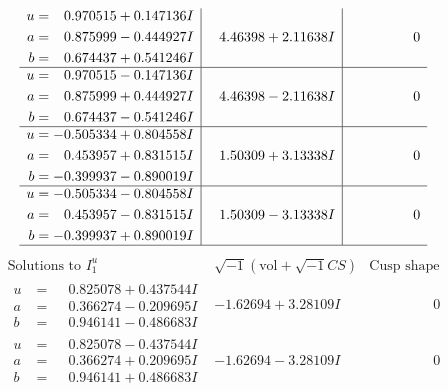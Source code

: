 \documentclass[1p]{elsarticle_modified}
\theoremstyle{definition}
\newcommand{\I}{\sqrt{-1}}
\begin{document}
$$\begin{array}{c|c|c}
\begin{aligned}
u &= \phantom{-}0.970515 + 0.147136 I \\
a &= \phantom{-}0.875999 - 0.444927 I \\
b &= \phantom{-}0.674437 + 0.541246 I\end{aligned}
 & \phantom{-}4.46398 + 2.11638 I & \phantom{-0.000000 } 0 \\ \hline\begin{aligned}
u &= \phantom{-}0.970515 - 0.147136 I \\
a &= \phantom{-}0.875999 + 0.444927 I \\
b &= \phantom{-}0.674437 - 0.541246 I\end{aligned}
 & \phantom{-}4.46398 - 2.11638 I & \phantom{-0.000000 } 0 \\ \hline\begin{aligned}
u &= -0.505334 + 0.804558 I \\
a &= \phantom{-}0.453957 + 0.831515 I \\
b &= -0.399937 - 0.890019 I\end{aligned}
 & \phantom{-}1.50309 + 3.13338 I & \phantom{-0.000000 } 0 \\ \hline\begin{aligned}
u &= -0.505334 - 0.804558 I \\
a &= \phantom{-}0.453957 - 0.831515 I \\
b &= -0.399937 + 0.890019 I\end{aligned}
 & \phantom{-}1.50309 - 3.13338 I & \phantom{-0.000000 } 0\\
 \hline 
 \end{array}$$\newpage$$\begin{array}{c|c|c}  
\text{Solutions to }I^u_{1}& \I (\text{vol} + \sqrt{-1}CS) & \text{Cusp shape}\\
 \hline 
\begin{aligned}
u &= \phantom{-}0.825078 + 0.437544 I \\
a &= \phantom{-}0.366274 - 0.209695 I \\
b &= \phantom{-}0.946141 - 0.486683 I\end{aligned}
 & -1.62694 + 3.28109 I & \phantom{-0.000000 } 0 \\ \hline\begin{aligned}
u &= \phantom{-}0.825078 - 0.437544 I \\
a &= \phantom{-}0.366274 + 0.209695 I \\
b &= \phantom{-}0.946141 + 0.486683 I\end{aligned}
 & -1.62694 - 3.28109 I & \phantom{-0.000000 } 0 \\ \hline\begin{aligned}

\end{aligned}
\end{array}$$
\end{document}
